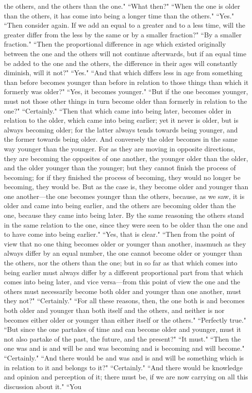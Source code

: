 \documentclass[letterpaper,12pt]{article}
\newcommand{\stephpag}[1]{\marginnote{\small\itshape\fontfamily{ppl}\selectfont #1}}
\begin{document}
the others, and the others than the one." ``What then?" ``When the one is older than the others, \stephpag{d} it has come into being a longer time than the others." ``Yes." ``Then consider again. If we add an equal to a greater and to a less time, will the greater differ from the less by the same or by a smaller fraction?" ``By a smaller fraction." ``Then the proportional difference in age which existed originally between the one and the others will not continue afterwards, but if an equal time be added to the one and the others, the difference in their ages will constantly diminish, will it not?" \stephpag{e} ``Yes." ``And that which differs less in age from something than before becomes younger than before in relation to those things than which it formerly was older?" ``Yes, it becomes younger." ``But if the one becomes younger, must not those other things in turn become older than formerly in relation to the one?" ``Certainly." ``Then that which came into being later, becomes older in relation to the older, which came into being earlier; yet it never is older, but is always becoming older; for the latter always tends towards being younger, \stephpag{155 a} and the former towards being older. And conversely the older becomes in the same way younger than the younger. For as they are moving in opposite directions, they are becoming the opposites of one another, the younger older than the older, and the older younger than the younger; but they cannot finish the process of becoming; for if they finished the process of becoming, they would no longer be becoming, they would be. But as the case is, they become older and younger than one another—the one becomes younger than the others, because, as we saw, it is older and came into being earlier, \stephpag{b} and the others are becoming older than the one, because they came into being later. By the same reasoning the others stand in the same relation to the one, since they were seen to be older than the one and to have come into being earlier." ``Yes, that is clear." ``Then from the point of view that no one thing becomes older or younger than another, inasmuch as they always differ by an equal number, the one cannot become older or younger than the others, nor the others than the one; but in so far as that which comes into being earlier must always differ by a different proportional part from that which comes into being later, \stephpag{c} and vice versa—from this point of view the one and the others must necessarily become both older and younger than one another, must they not?" ``Certainly." ``For all these reasons, then, the one both is and becomes both older and younger than both itself and the others, and neither is nor becomes either older or younger than either itself or the others." ``Perfectly true." ``But since the one partakes of time and can become older and younger, \stephpag{d} must it not also partake of the past, the future, and the present?" ``It must." ``Then the one was and is and will be and was becoming and is becoming and will become." ``Certainly." ``And there would be and was and is and will be something which is in relation to it and belongs to it?" ``Certainly." ``And there would be knowledge and opinion and perception of it; there must be, if we are now carrying on all this discussion about it." ``You 
\end{document}
